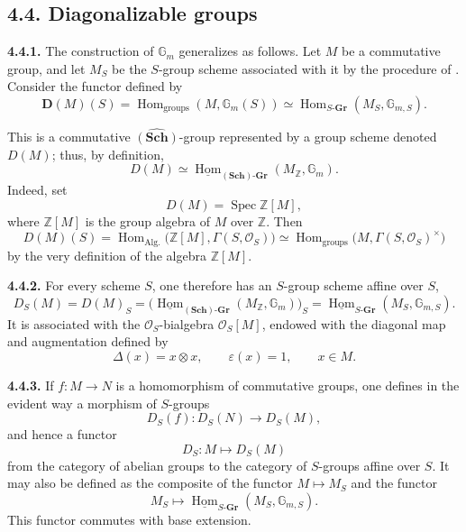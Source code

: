 
\subsection*{4.4. Diagonalizable groups}

\medskip
\noindent{}\textbf{4.4.1.}
The construction of \(\mathbb G_m\) generalizes as follows. Let \(M\)
be a commutative group, and let \(M_S\) be the \(S\)-group scheme
associated with it by the procedure of . Consider the functor defined
by
\[
  \mathbf D(M)(S)
    =\operatorname{Hom}_{\mathrm{groups}}(M,\mathbb G_m(S))
    \simeq
      \operatorname{Hom}_{S\text{-}\mathbf{Gr}}
        (M_S,\mathbb G_{m,S}).
\]

This is a commutative \(\widehat{(\mathbf{Sch})}\)-group represented by a
group scheme denoted \(D(M)\); thus, by definition,
\[
  D(M)\simeq
  \underline{\operatorname{Hom}}_{(\mathbf{Sch})\text{-}\mathbf{Gr}}
    (M_{\mathbb Z},\mathbb G_m).
\]
Indeed, set
\[
  D(M)=\operatorname{Spec}\mathbb Z[M],
\]
where \(\mathbb Z[M]\) is the group algebra of \(M\) over \(\mathbb Z\).
Then
\[
  D(M)(S)
    =\operatorname{Hom}_{\mathrm{Alg.}}
       \bigl(\mathbb Z[M],\Gamma(S,\mathcal O_S)\bigr)
    \simeq
      \operatorname{Hom}_{\mathrm{groups}}
       \bigl(M,\Gamma(S,\mathcal O_S)^{\times}\bigr)
\]
by the very definition of the algebra \(\mathbb Z[M]\).

\medskip
\noindent{}\textbf{4.4.2.}
For every scheme \(S\), one therefore has an \(S\)-group scheme affine
over \(S\),
\[
  D_S(M)=D(M)_S
    =\bigl(
      \underline{\operatorname{Hom}}_{(\mathbf{Sch})\text{-}\mathbf{Gr}}
        (M_{\mathbb Z},\mathbb G_m)
      \bigr)_S
    =\underline{\operatorname{Hom}}_{S\text{-}\mathbf{Gr}}
       (M_S,\mathbb G_{m,S}).
\]
It is associated with the \(\mathcal O_S\)-bialgebra
\(\mathcal O_S[M]\), endowed with the diagonal map and augmentation
defined by
\[
  \Delta(x)=x\otimes x,
  \qquad
  \varepsilon(x)=1,
  \qquad x\in M.
\]

\medskip
\noindent{}\textbf{4.4.3.}
If \(f:M\to N\) is a homomorphism of commutative groups, one defines in
the evident way a morphism of \(S\)-groups
\[
  D_S(f):D_S(N)\longrightarrow D_S(M),
\]
and hence a functor
\[
  D_S:M\longmapsto D_S(M)
\]
from the category of abelian groups to the category of \(S\)-groups
affine over \(S\). It may also be defined as the composite of the
functor \(M\mapsto M_S\) and the functor
\[
  M_S\longmapsto
  \underline{\operatorname{Hom}}_{S\text{-}\mathbf{Gr}}
    (M_S,\mathbb G_{m,S}).
\]
This functor commutes with base extension.

